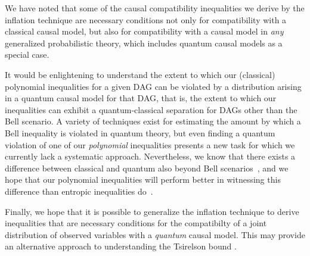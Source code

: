 \documentclass[aps,english,superscriptaddress,onecolumn,twoside,longbibliography,pra,floatfix,fleqn,nofootinbib]{revtex4-1}%
\theoremstyle{definition}
\begin{document}
We have noted that some of the causal compatibility inequalities we derive by the inflation technique are necessary conditions not only for compatibility with a classical causal model, but also 
for compatibility with a causal model in {\em any} generalized probabilistic theory, which includes quantum causal models as a special case.  


It would be enlightening to understand the extent to which our (classical) polynomial inequalities for a given DAG can be violated by a distribution arising in a quantum causal model for that DAG, that is, the extent to which our inequalities can exhibit  a quantum-classical separation for DAGs other than the Bell scenario.  A variety of techniques exist for estimating the amount by which a Bell inequality \cite{NPA2008Long,I3322NPA1} is violated in quantum theory, but even finding a quantum violation of one of our \emph{polynomial} inequalities presents a new task for which we currently lack a systematic approach. Nevertheless, we know that there exists a difference between classical and quantum also beyond Bell scenarios~\cite[Theorem~2.16]{fritz2012bell}, and we hope that our polynomial inequalities will perform better in witnessing this difference than entropic inequalities do~\cite{pusey2014gdag,Chaves2015infoquantum}.

Finally, we hope that it is possible to generalize the inflation technique to derive inequalities that are necessary conditions for the compatibilty of a joint distribution of observed variables with a {\em quantum} causal model.  This may provide an alternative approach to understanding the Tsirelson bound \cite{Brunner2013Bell}.
\end{document}
